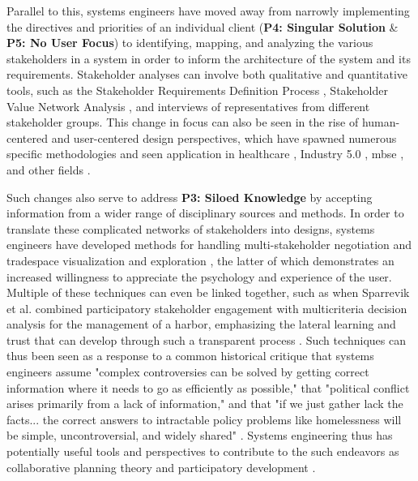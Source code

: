 Parallel to this, systems engineers have moved away from narrowly implementing the directives and priorities of an individual client (\textbf{P4: Singular Solution} \& \textbf{P5: No User Focus}) to identifying, mapping, and analyzing the various stakeholders in a system in order to inform the architecture of the system and its requirements. Stakeholder analyses can involve both qualitative and quantitative tools, such as the Stakeholder Requirements Definition Process \cite{incoseINCOSESystemsEngineering2015}, Stakeholder Value Network Analysis \cite{fengDependencyStructureMatrix2010a}, and interviews of representatives from different stakeholder groups. This change in focus can also be seen in the rise of human-centered and user-centered design perspectives, which have spawned numerous specific methodologies and seen application in healthcare \cite{samarasSystemsEngineeringPerspective2005}, Industry 5.0 \cite{longoValueOrientedEthicalTechnology2020}, \ac{mbse} \cite{kimChallengesApplyingModelbased2019}, and other fields \cite{ritterFoundationsDesigningUserCentered2014}.

Such changes also serve to address \textbf{P3: Siloed Knowledge} by accepting information from a wider range of disciplinary sources and methods. In order to translate these complicated networks of stakeholders into designs, systems engineers have developed methods for handling multi-stakeholder negotiation and \cite{fitzgeraldEffectsEnhancedMultiparty2015,fitzgeraldRecommendationsFramingMultistakeholder2016,weckMULTISTAKEHOLDERSIMULATIONGAMING2012} tradespace visualization and exploration \cite{fitzgeraldEffectsEnhancedMultiparty2015,fitzgeraldRecommendationsFramingMultistakeholder2016,groganInteractiveModelsSystem2015,rossMultiAttributeTradespaceExploration2004,selvavaleroRulebasedSystemArchitecting2012}, the latter of which demonstrates an increased willingness to appreciate the psychology and experience of the user. Multiple of these techniques can even be linked together, such as when Sparrevik et al. combined participatory stakeholder engagement with multicriteria decision analysis for the management of a harbor, emphasizing the lateral learning and trust that can develop through such a transparent process \cite{sparrevikUseMulticriteriaInvolvement2011}. Such techniques can thus been seen as a response to a common historical critique that systems engineers assume "complex controversies can be solved by getting correct information where it needs to go as efficiently as possible," that "political conflict arises primarily from a lack of information," and that "if we just gather lack the facts... the correct answers to intractable policy problems like homelessness will be simple, uncontroversial, and widely shared" \cite{eubanksAutomatingInequalityHow2018}. Systems engineering thus has potentially useful tools and perspectives to contribute to the such endeavors as collaborative planning theory \cite{goodspeedDeathLifeCollaborative2016} and participatory development \cite{pertParticipatoryDevelopmentNew2013}.

